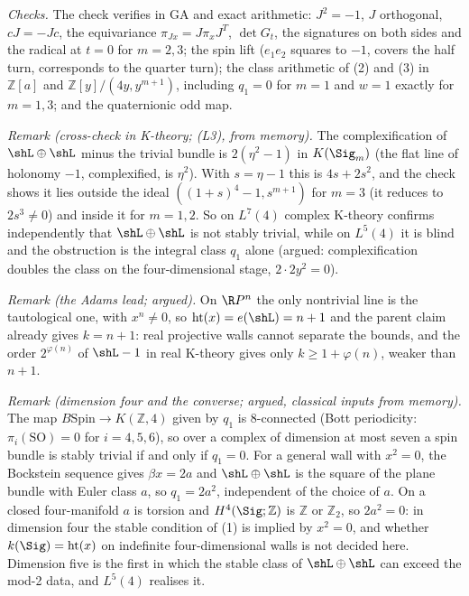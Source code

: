 \emph{Checks.} The check verifies in GA and exact arithmetic: $J^{2} = -1$, $J$ orthogonal, $cJ = -Jc$, the equivariance $\pi_{Jx} = J\pi_{x}J^{T}$, $\det G_{t}$, the signatures on both sides and the radical at $t = 0$ for $m = 2, 3$; the spin lift ($e_{1}e_{2}$ squares to $-1$, covers the half turn, corresponds to the quarter turn); the class arithmetic of (2) and (3) in $\mathbb{Z}[a]$ and $\mathbb{Z}[y]/(4y, y^{m+1})$, including $q_{1} = 0$ for $m = 1$ and $w = 1$ exactly for $m = 1, 3$; and the quaternionic odd map.

\emph{Remark (cross-check in K-theory; (L3), from memory).} The complexification of $\shL \oplus \shL$ minus the trivial bundle is $2(\eta^{2} - 1)$ in $K(\Sig_{m})$ (the flat line of holonomy $-1$, complexified, is $\eta^{2}$). With $s = \eta - 1$ this is $4s + 2s^{2}$, and the check shows it lies outside the ideal $((1+s)^{4} - 1, s^{m+1})$ for $m = 3$ (it reduces to $2s^{3} \neq 0$) and inside it for $m = 1, 2$. So on $L^{7}(4)$ complex K-theory confirms independently that $\shL \oplus \shL$ is not stably trivial, while on $L^{5}(4)$ it is blind and the obstruction is the integral class $q_{1}$ alone (argued: complexification doubles the class on the four-dimensional stage, $2 \cdot 2y^{2} = 0$).

\emph{Remark (the Adams lead; argued).} On $\R P^{n}$ the only nontrivial line is the tautological one, with $x^{n} \neq 0$, so $\operatorname{ht}(x) = e(\shL) = n+1$ and the parent claim already gives $k = n + 1$: real projective walls cannot separate the bounds, and the order $2^{\varphi(n)}$ of $\shL - 1$ in real K-theory gives only $k \geq 1 + \varphi(n)$, weaker than $n + 1$.

\emph{Remark (dimension four and the converse; argued, classical inputs from memory).} The map $B\mathrm{Spin} \to K(\mathbb{Z}, 4)$ given by $q_{1}$ is $8$-connected (Bott periodicity: $\pi_{i}(\mathrm{SO}) = 0$ for $i = 4, 5, 6$), so over a complex of dimension at most seven a spin bundle is stably trivial if and only if $q_{1} = 0$. For a general wall with $x^{2} = 0$, the Bockstein sequence gives $\beta x = 2a$ and $\shL \oplus \shL$ is the square of the plane bundle with Euler class $a$, so $q_{1} = 2a^{2}$, independent of the choice of $a$. On a closed four-manifold $a$ is torsion and $H^{4}(\Sig; \mathbb{Z})$ is $\mathbb{Z}$ or $\mathbb{Z}_{2}$, so $2a^{2} = 0$: in dimension four the stable condition of (1) is implied by $x^{2} = 0$, and whether $k(\Sig) = \operatorname{ht}(x)$ on indefinite four-dimensional walls is not decided here. Dimension five is the first in which the stable class of $\shL \oplus \shL$ can exceed the mod-2 data, and $L^{5}(4)$ realises it.
